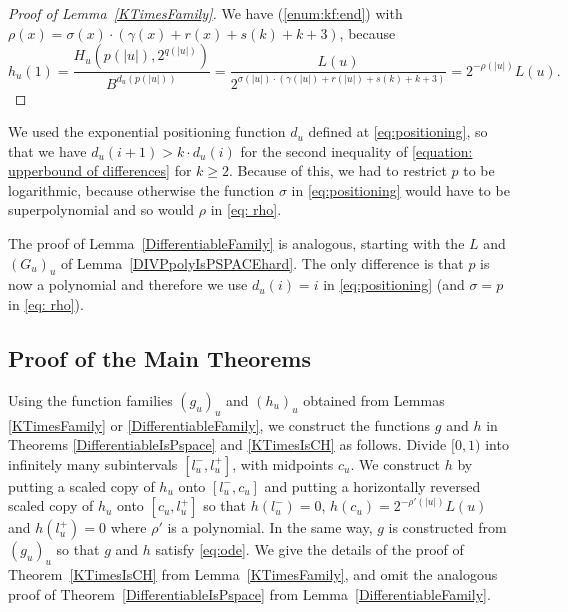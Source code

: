 \documentclass{lmcs}
\theoremstyle{definition}
\theoremstyle{remark}
\begin{document}
\begin{proof}[Proof of Lemma~\ref{KTimesFamily}]
We have (\ref{enum:kf:end}) with
  $\rho(x) = \sigma(x) \cdot (\gamma(x)+r(x)+s(k)+k+3)$, because
  \begin{equation}
\label{eq: rho}
   h_u(1) 
   = \frac{H_u(p(|u|), 2^{q(|u|)})}{B^{d_u(p(|u|))}} 
   = \frac{L(u)}{2^{\sigma(|u|) \cdot (\gamma(|u|)+r(|u|)+s(k)+k+3)}} 
   = 2^{-\rho(|u|)} L(u). 
  \end{equation}
\end{proof}

We used the exponential positioning function $d _u$ 
defined at \eqref{eq:positioning}, 
so that we have $d _u (i + 1) > k \cdot d _u (i)$ for the 
second inequality of \eqref{equation: upperbound of differences}
for $k \geq 2$. 
Because of this, we had to restrict $p$ to be logarithmic, 
because otherwise the function $\sigma$ in \eqref{eq:positioning}
would have to be superpolynomial and so would $\rho$ in \eqref{eq: rho}. 

The proof of Lemma~\ref{DifferentiableFamily} is analogous, 
starting with the $L$ and $(G_u)_u$ of Lemma~\ref{DIVPpolyIsPSPACEhard}. 
The only difference is that $p$ is now a polynomial 
and therefore we use $d _u (i) = i$ in \eqref{eq:positioning}
(and $\sigma = p$ in \eqref{eq: rho}). 

\subsection{Proof of the Main Theorems}
\label{subsection: proof of theorems}
Using the function families $(g_u)_u$ and $(h_u)_u$ 
obtained from Lemmas \ref{KTimesFamily} or \ref{DifferentiableFamily}, 
we construct the functions $g$ and $h$ in 
Theorems \ref{DifferentiableIsPspace} and \ref{KTimesIsCH} as follows. 
Divide $[0,1)$ into infinitely many subintervals $[l^-_u, l^+_u]$,
with midpoints $c_u$.
We construct $h$ by putting a scaled copy of $h_u$ onto $[l^-_u, c_u]$ and
putting a horizontally reversed scaled copy of $h_u$ onto $[c_u, l^+_u]$ 
so that $h(l^-_u) = 0$, $h(c_u) = 2^{-\rho'(|u|)} L(u)$ and $h(l^+_u) = 0$ where $\rho'$ is a polynomial.
In the same way, $g$ is constructed from $(g_u)_u$ so that $g$ and $h$ satisfy \eqref{eq:ode}.
We give the details of the proof of 
Theorem~\ref{KTimesIsCH} from Lemma~\ref{KTimesFamily}, 
and omit the analogous proof of Theorem~\ref{DifferentiableIsPspace} 
from Lemma~\ref{DifferentiableFamily}. 
\end{document}
